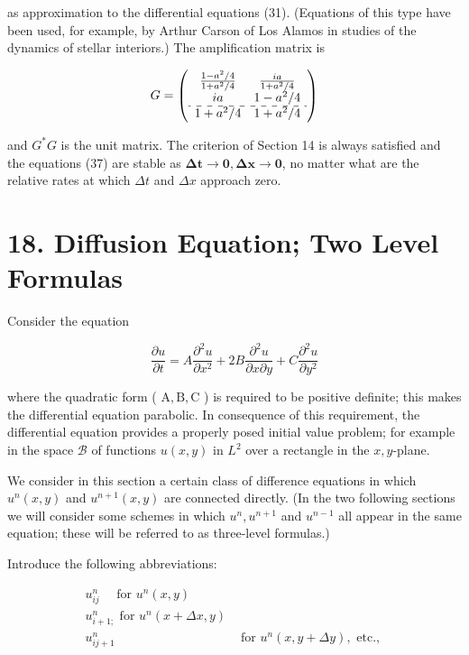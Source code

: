\documentclass[10pt]{article}
\begin{document}
as approximation to the differential equations (31). (Equations of this type have been used, for example, by Arthur Carson of Los Alamos in studies of the dynamics of stellar interiors.) The amplification matrix is

\[
G=\left(\begin{array}{cc}
\frac{1-a^{2} / 4}{1+a^{2} / 4} & \frac{i a}{1+a^{2} / 4} \\
i a & 1-a^{2} / 4 \\
\hdashline 1+a^{2} / 4 & 1+a^{2} / 4
\end{array}\right)
\]

and \(G^{*} G\) is the unit matrix. The criterion of Section 14 is always satisfied and the equations (37) are stable as \(\boldsymbol{\Delta} \boldsymbol{t} \boldsymbol{\rightarrow} \boldsymbol{0}, \boldsymbol{\Delta} \boldsymbol{x} \rightarrow \boldsymbol{0}\), no matter what are the relative rates at which \(\Delta t\) and \(\Delta x\) approach zero.

\section*{18. Diffusion Equation; Two Level Formulas}
Consider the equation

\[
\frac{\partial u}{\partial t}=A \frac{\partial^{2} u}{\partial x^{2}}+2 B \frac{\partial^{2} u}{\partial x \partial y}+C \frac{\partial^{2} u}{\partial y^{2}}
\]

where the quadratic form ( \(\mathrm{A}, \mathrm{B}, \mathrm{C}\) ) is required to be positive definite; this makes the differential equation parabolic. In consequence of this requirement, the differential equation provides a properly posed initial value problem; for example in the space \(\mathscr{B}\) of functions \(u(x, y)\) in \(L^{2}\) over a rectangle in the \(x, y\)-plane.

We consider in this section a certain class of difference equations in which \(u^{n}(x, y)\) and \(u^{n+1}(x, y)\) are connected directly. (In the two following sections we will consider some schemes in which \(u^{n}, u^{n+1}\) and \(u^{n-1}\) all appear in the same equation; these will be referred to as three-level formulas.)

Introduce the following abbreviations:

\[
\begin{array}{ll}
u_{i j}^{n} \quad \text { for } u^{n}(x, y) \\
u_{i+1 ;}^{n} \text { for } u^{n}(x+\Delta x, y) \\
u_{i j+1}^{n} & \text { for } u^{n}(x, y+\Delta y), \text { etc., }
\end{array}
\]
\end{document}
